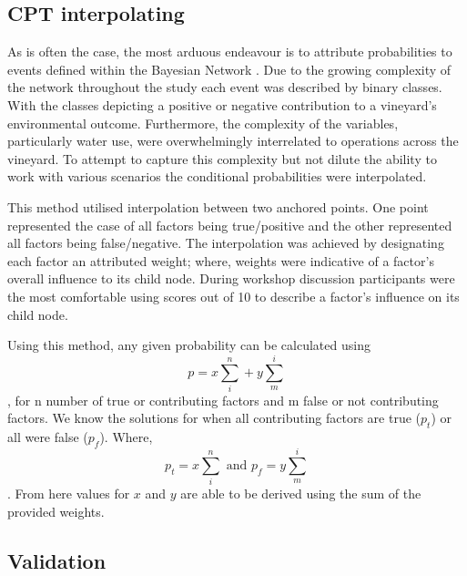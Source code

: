 \subsection{CPT interpolating}

As is often the case, the most arduous endeavour is to attribute probabilities to events defined within the Bayesian Network \citep{korbBayesianArtificialIntelligence2011}. Due to the growing complexity of the network throughout the study each event was described by binary classes. With the classes depicting a positive or negative contribution to a vineyard's environmental outcome. Furthermore, the complexity of the variables, particularly water use, were overwhelmingly interrelated to operations across the vineyard. To attempt to capture this complexity but not dilute the ability to work with various scenarios the conditional probabilities were interpolated.

This method utilised interpolation between two anchored points. One point represented the case of all factors being true/positive and the other represented all factors being false/negative. The interpolation was achieved by designating each factor an attributed weight; where, weights were indicative of a factor's overall influence to its child node. During workshop discussion participants were the most comfortable using scores out of 10 to describe a factor's influence on its child node.

Using this method, any given probability can be calculated using
\begin{equation}
        p=x\sum_{i}^{n} + y\sum_{m}^{i} 
\end{equation},
for n number of true or contributing factors and m false or not contributing factors. We know the solutions for when all contributing factors are true ($p_t$) or all were false ($p_f$). Where,
\begin{equation}
        p_t=x\sum_{i}^{n} 
        \text{ and }
        p_f=y\sum_{m}^{i}
\end{equation}.
From here values for $x$ and $y$ are able to be derived using the sum of the provided weights.

\subsection{Validation}

